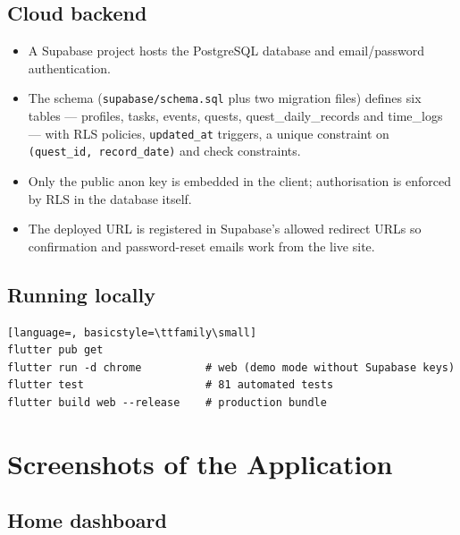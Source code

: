 \documentclass[12pt,a4paper]{article}
\begin{document}
\subsection{Cloud backend}
\begin{itemize}
  \item A Supabase project hosts the PostgreSQL database and email/password
        authentication.
  \item The schema (\texttt{supabase/schema.sql} plus two migration files)
        defines six tables --- profiles, tasks, events, quests,
        quest\_daily\_records and time\_logs --- with RLS policies,
        \texttt{updated\_at} triggers, a unique constraint on
        \texttt{(quest\_id, record\_date)} and check constraints.
  \item Only the public anon key is embedded in the client; authorisation
        is enforced by RLS in the database itself.
  \item The deployed URL is registered in Supabase's allowed redirect URLs
        so confirmation and password-reset emails work from the live site.
\end{itemize}

\subsection{Running locally}
\begin{lstlisting}[language=, basicstyle=\ttfamily\small]
flutter pub get
flutter run -d chrome          # web (demo mode without Supabase keys)
flutter test                   # 81 automated tests
flutter build web --release    # production bundle
\end{lstlisting}

\section{Screenshots of the Application}


\subsection{Home dashboard}
\end{document}

